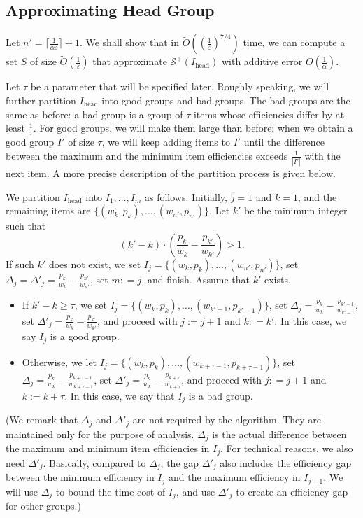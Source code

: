 \documentclass[a4paper,UKenglish,cleveref, autoref, thm-restate, pdfa]{lipics-v2021}
\newcommand{\eps}{\varepsilon}
\renewcommand{\geq}{\geqslant}
\begin{document}
\subsection{Approximating Head Group}\label{sec:strong-head-incomp}
Let $n' = \lceil \frac{1}{\alpha\eps}\rceil + 1$.  We shall show that in $\tilde{O}((\frac{1}{\eps})^{7/4})$ time, we can compute a set $S$ of size $\tilde{O}(\frac{1}{\eps})$ that approximate $\mathcal{S}^+(I_{\mathrm{head}})$ with additive error $O(\frac{1}{\alpha})$.

Let $\tau$ be a parameter that will be specified later. Roughly speaking, we will further partition $I_{\mathrm{head}}$ into good groups and bad groups. The bad groups are the same as before: a bad group is a group of $\tau$ items whose efficiencies differ by at least $\frac{1}{\tau}$. For good groups, we will make them large than before: when we obtain a good group $I'$ of size $\tau$, we will keep adding items to $I'$ until the difference between the maximum and the minimum item efficiencies exceeds $\frac{1}{|I'|}$ with the next item. A more precise description of the partition process is given below. 

We partition $I_{\mathrm{head}}$ into $I_1, \ldots, I_m$ as follows. Initially, $j = 1$ and $k = 1$, and the remaining items are $\{(w_k, p_k), \ldots, (w_{n'}, p_{n'})\}$. Let $k'$ be the minimum integer such that
\[
    (k' - k) \cdot (\frac{p_k}{w_k} - \frac{p_{k'}}{w_{k'}}) > 1.
\]
If such $k'$ does not exist, we set $I_j = \{(w_k, p_k), \ldots, (w_{n'}, p_{n'})\}$, set $\Delta_j = \Delta'_j = \frac{p_k}{w_k} - \frac{p_{n'}}{w_{n'}}$, set $m: = j$, and finish. Assume that $k'$ exists. 
\begin{itemize}
    \item If $k' - k \geq \tau$, we set $I_j = \{(w_k, p_k), \ldots, (w_{k' - 1}, p_{k'-1})\}$, set $\Delta_j = \frac{p_k}{w_k} - \frac{p_{k'-1}}{w_{k'-1}}$, set $\Delta'_j = \frac{p_k}{w_k} - \frac{p_{k'}}{w_{k'}}$, and proceed with $j := j + 1$ and $k: = k'$. In this case, we say $I_j$ is a good group. 

    \item Otherwise, we let $I_j = \{(w_k, p_k), \ldots, (w_{k + \tau - 1}, p_{k + \tau - 1})\}$, set $\Delta_j = \frac{p_k}{w_k} - \frac{p_{k + \tau - 1}}{w_{k+\tau - 1}}$, set $\Delta'_j = \frac{p_k}{w_k} - \frac{p_{k + \tau}}{w_{k+\tau}}$, and proceed with $j: = j + 1$ and $k:= k + \tau$. In this case, we say that $I_j$ is a bad group. 
\end{itemize}
(We remark that $\Delta_j$ and $\Delta'_j$ are not required by the algorithm. They are maintained only for the purpose of analysis. $\Delta_j$ is the actual difference between the maximum and minimum item efficiencies in $I_j$. For technical reasons, we also need $\Delta'_j$. Basically, compared to $\Delta_j$, the gap $\Delta'_j$ also includes the efficiency gap between the minimum efficiency in $I_j$ and the maximum efficiency in $I_{j+1}$. We will use $\Delta_j$ to bound the time cost of $I_j$, and use $\Delta'_j$ to create an efficiency gap for other groups.)
\end{document}
